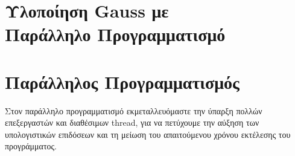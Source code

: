 \section{Υλοποίηση {\lt Gauss} με \\ Παράλληλο Προγραμματισμό}


\section{Παράλληλος Προγραμματισμός}

Στον παράλληλο προγραμματισμό εκμεταλλευόμαστε την ύπαρξη πολλών επεξεργαστών και διαθέσιμων {\lt thread}, για να πετύχουμε την αύξηση των υπολογιστικών επιδόσεων και τη μείωση του απαιτούμενου χρόνου εκτέλεσης του προγράμματος. 
\\




\newpage


